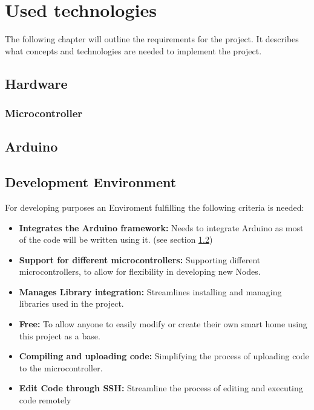 \chapter{Used technologies} 
The following chapter will outline the requirements for the 
project. It describes what concepts and technologies are needed
to implement the project.
    \section{Hardware}
        \subsection{Microcontroller}
        
    \section{Arduino}\label{sec:arduino}

    \section{Development Environment}
    For developing purposes an Enviroment fulfilling the following criteria is needed:
    \begin{itemize}[itemsep=0em]
        \item \textbf{Integrates the Arduino framework:}
        Needs to integrate Arduino as most of the code will be written using it. 
        (see section \ref{sec:arduino})
        \item \textbf{Support for different microcontrollers:}
        Supporting different microcontrollers, to allow for flexibility
        in developing new Nodes.
        \item \textbf{Manages Library integration:}
        Streamlines installing and managing libraries used in the project.
        \item \textbf{Free:}
        To allow anyone to easily modify  or create their own smart home
        using this project as a base.
        \item \textbf{Compiling and uploading code:} 
        Simplifying the process of uploading code to the microcontroller.
        \item \textbf{Edit Code through SSH:}
        Streamline the process of editing and executing code remotely
    \end{itemize} 

